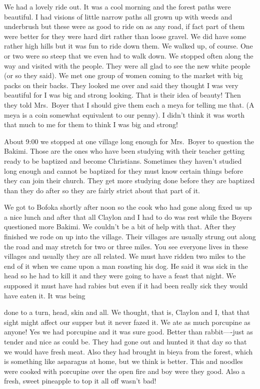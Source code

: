 \documentclass[
]{book}
\begin{document}
We had a lovely ride out. It was a cool morning and the forest paths were beautiful. I had visions of little narrow paths all grown up with weeds and underbrush but these were as good to ride on as any road, if fact part of them were better for they were hard dirt rather than loose gravel. We did have some rather high hills but it was fun to ride down them. We walked up, of course. One or two were so steep that we even had to walk down. We stopped often along the way and visited with the people. They were all glad to see the new white people (or so they said). We met one group of women coming to the market with big packs on their backs. They looked me over and said they thought I was very beautiful for I was big and strong looking. That is their idea of beauty! Then they told Mrs.~Boyer that I should give them each a meya for telling me that. (A meya is a coin somewhat equivalent to our penny). I didn't think it was worth that much to me for them to think I was big and strong!

About 9:00 we stopped at one village long enough for Mrs.~Boyer to question the Bakimi. Those are the ones who have been studying with their teacher getting ready to be baptized and become Christians. Sometimes they haven't studied long enough and cannot be baptized for they must know certain things before they can join their church. They get more studying done before they are baptized than they do after so they are fairly strict about that part of it.

We got to Bofoka shortly after noon so the cook who had gone along fixed us up a nice lunch and after that all Claylon and I had to do was rest while the Boyers questioned more Bakimi. We couldn't be a bit of help with that. After they finished we rode on up into the village. Their villages are usually strung out along the road and may stretch for two or three miles. You see everyone lives in these villages and usually they are all related. We must have ridden two miles to the end of it when we came upon a man roasting his dog. He said it was sick in the head so he had to kill it and they were going to have a feast that night. We supposed it must have had rabies but even if it had been really sick they would have eaten it. It was being

done to a turn, head, skin and all. We thought, that is, Claylon and I, that that sight might affect our supper but it never fazed it. We ate as much porcupine as anyone! Yes we had porcupine and it was sure good. Better than rabbit----just as tender and nice as could be. They had gone out and hunted it that day so that we would have fresh meat. Also they had brought in bieya from the forest, which is something like asparagus at home, but we think is better. This and noodles were cooked with porcupine over the open fire and boy were they good. Also a fresh, sweet pineapple to top it all off wasn't bad!
\end{document}
